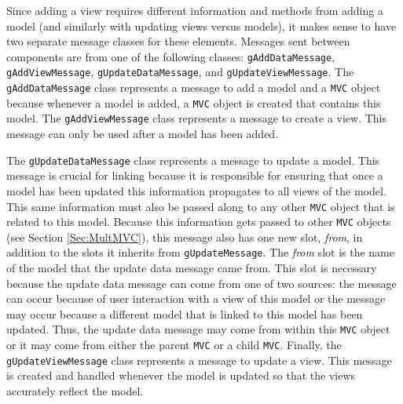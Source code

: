 \documentclass{article}[11pt]
\newcommand{\Robject}[1]{{\texttt{#1}}}
\newcommand{\Rslot}[1]{\textsl{#1}}
\newcommand{\Rclass}[1]{\texttt{#1}}
\begin{document}
Since adding a view requires different information and methods from adding a
model (and similarly with updating views versus models), it makes sense to
have two separate message classes for these elements.  Messages
sent between components are from one of the following classes:
\Rclass{gAddDataMessage}, \Rclass{gAddViewMessage},
\Rclass{gUpdateDataMessage}, and \Rclass{gUpdateViewMessage}.  The
\Rclass{gAddDataMessage} class represents a message to add a model
and a \Robject{MVC} object because whenever a model is added, a
\Robject{MVC} object is created that contains this model.  The
\Rclass{gAddViewMessage} class represents a message to create a view.  This
message can only be used after a model has been added. 

The \Rclass{gUpdateDataMessage} class represents a message to update
a model.  This message is crucial for linking because it is
responsible for ensuring that once a model has been updated this
information propagates to all views of the model.  This
same information must also be passed along to any other \Robject{MVC} object
that is related to this model.  Because this
information gets passed to other \Robject{MVC} objects (see Section
\ref{Sec:MultMVC}), this message also has one new slot, \Rslot{from}, in
addition to the slots it inherits from \Rclass{gUpdateMessage}.  The
\Rslot{from} slot is the name of the model that the update data
message came from.  This slot is necessary because the update data message can
come from one of two sources: the message can occur because of user
interaction with a view of this model or the message may
occur because a different model that is
linked to this model has been updated.  Thus, the update data
message may come from within this \Robject{MVC} object or it may come from
either the parent \Robject{MVC} or a child \Robject{MVC}.  Finally, the
\Rclass{gUpdateViewMessage} class represents a message to update a
view.  This message is created and handled whenever the
model is updated so that the views accurately reflect the model. 

\end{document}
